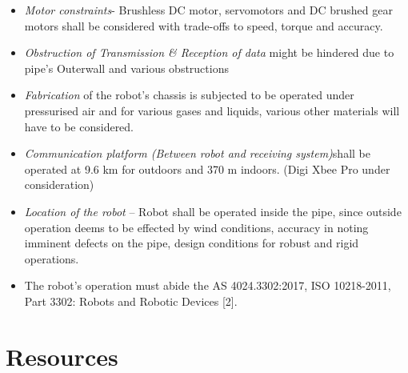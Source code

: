\documentclass[a4paper]{article}
\begin{document}
\begin{itemize}
    \item{\textit{Motor constraints}- Brushless DC motor, servomotors and DC brushed gear motors shall be considered with trade-offs to speed, torque and accuracy.}
    \item{\textit{Obstruction of Transmission \& Reception of data} might be hindered due to pipe’s Outerwall and various obstructions}
    \item{\textit{Fabrication} of the robot’s chassis is subjected to be operated under pressurised air and for various gases and liquids, various other materials will have to be considered.}
    \item{\textit{Communication platform (Between robot and receiving system)}shall be operated at 9.6 km for outdoors and 370 m indoors. (Digi Xbee Pro under consideration)}
    \item{\textit{Location of the robot} – Robot shall be operated inside the pipe, since outside operation deems to be effected by wind conditions, accuracy in noting imminent defects on the pipe, design conditions for robust and rigid operations.}
    \item{The robot’s operation must abide the AS 4024.3302:2017, ISO 10218-2011, Part 3302: Robots and Robotic Devices [2].}
\end{itemize}
\section {Resources}
\end{document}
